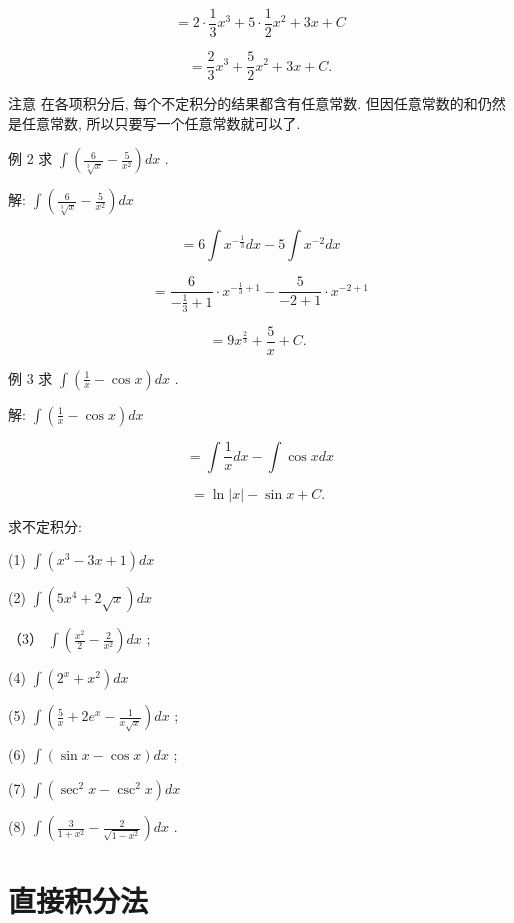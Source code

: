 \documentclass[lang=cn,newtx,10pt,scheme=chinese]{elegantbook}
\begin{document}
\[
= 2 \cdot \frac{1}{3}{x}^{3} + 5 \cdot \frac{1}{2}{x}^{2} + {3x} + C
\]

\[
= \frac{2}{3}{x}^{3} + \frac{5}{2}{x}^{2} + {3x} + C.
\]

注意 在各项积分后, 每个不定积分的结果都含有任意常数. 但因任意常数的和仍然是任意常数, 所以只要写一个任意常数就可以了.

例 2 求 \(\int \left( {\frac{6}{\sqrt[3]{x}} - \frac{5}{{x}^{2}}}\right) {dx}\) .

解: \(\int \left( {\frac{6}{\sqrt[3]{x}} - \frac{5}{{x}^{2}}}\right) {dx}\)

\[
= 6\int {x}^{-\frac{1}{3}}{dx} - 5\int {x}^{-2}{dx}
\]

\[
= \frac{6}{-\frac{1}{3} + 1} \cdot {x}^{-\frac{1}{3} + 1} - \frac{5}{-2 + 1} \cdot {x}^{-2 + 1}
\]

\[
= 9{x}^{\frac{2}{3}} + \frac{5}{x} + C\text{. }
\]

例 3 求 \(\int \left( {\frac{1}{x} - \cos x}\right) {dx}\) .

解: \(\int \left( {\frac{1}{x} - \cos x}\right) {dx}\)

\[
= \int \frac{1}{x}{dx} - \int \cos {xdx}
\]

\[
= \ln \left| x\right| - \sin x + C\text{. }
\]

\begin{problemset}[练习]

\item 求不定积分:

(1) \(\int \left( {{x}^{3} - {3x} + 1}\right) {dx}\)

(2) \(\int \left( {5{x}^{4} + 2\sqrt{x}}\right) {dx}\)

（3） \(\int \left( {\frac{{x}^{2}}{2} - \frac{2}{{x}^{2}}}\right) {dx}\) ;

(4) \(\int \left( {{2}^{x} + {x}^{2}}\right) {dx}\)

(5) \(\int \left( {\frac{5}{x} + 2{e}^{x} - \frac{1}{x\sqrt{x}}}\right) {dx}\) ;

(6) \(\int \left( {\sin x - \cos x}\right) {dx}\) ;

(7) \(\int \left( {{\sec }^{2}x - {\csc }^{2}x}\right) {dx}\)

(8) \(\int \left( {\frac{3}{1 + {x}^{2}} - \frac{2}{\sqrt{1 - {x}^{2}}}}\right) {dx}\) .

\end{problemset}

\section{直接积分法}
\end{document}
